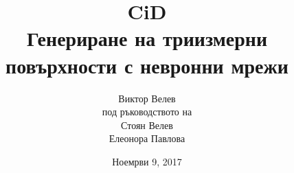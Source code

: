 \title{
\Huge CiD\\
Генериране на триизмерни повърхности с невронни мрежи
}

\author{
Виктор Велев
\vspace{1in}\\
под ръководството на\\
Стоян Велев\\
Елеонора Павлова
}
\date{
Ноемрви 9, 2017
}